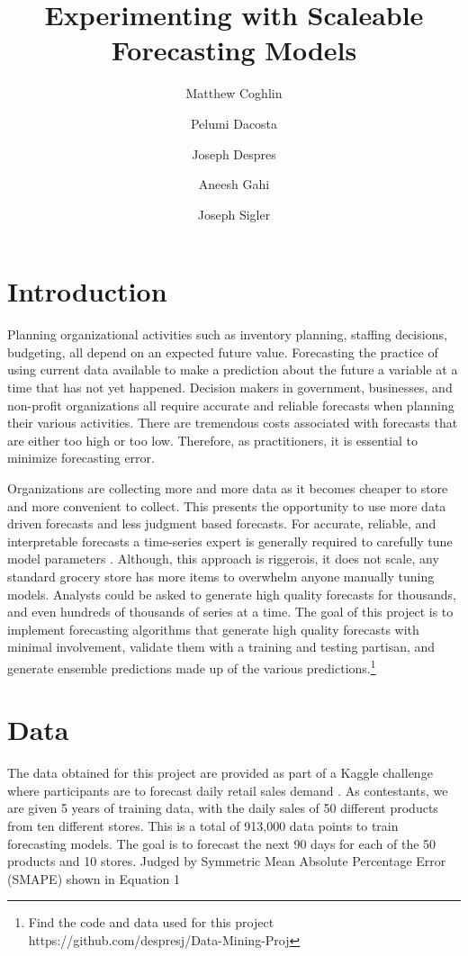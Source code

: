 \documentclass[16pt,twocolumn,letterpaper]{article}
\title{Experimenting with Scaleable Forecasting Models}
\author{
    Matthew Coghlin\\
  	\and
  	Pelumi Dacosta\\
    \and
    Joseph Despres\\
    \and
    Aneesh Gahi\\
    \and
    Joseph Sigler\\
}
\begin{document}
\maketitle



\section{Introduction}

Planning organizational activities such as inventory planning, staffing decisions, budgeting, all depend on an expected future value. Forecasting the practice of using current data available to make a prediction about the future a variable at a time that has not yet happened. Decision makers in government, businesses, and non-profit organizations all require accurate and reliable forecasts when planning their various activities. There are tremendous costs associated with forecasts that are either too high or too low. Therefore, as practitioners, it is essential to minimize forecasting error. 

Organizations are collecting more and more data as it becomes cheaper to store and more convenient to collect. This presents the opportunity to use more data driven forecasts and less judgment based forecasts. For accurate, reliable, and interpretable forecasts a time-series expert is generally required to carefully tune model parameters \cite{taylor2018forecasting}. Although, this approach is riggerois, it does not scale, any standard grocery store has more items to overwhelm anyone manually tuning models. Analysts could be asked to generate high quality forecasts for thousands, and even hundreds of thousands of series at a time. The goal of this project is to implement forecasting algorithms that generate high quality forecasts with minimal involvement, validate them with a training and testing partisan, and generate ensemble predictions made up of the various predictions.\footnote{Find the code and data used for this project https://github.com/despresj/Data-Mining-Proj} 

\section{Data}

The data obtained for this project are provided as part of a Kaggle challenge where participants are to forecast daily retail sales demand \cite{kaggle}. As contestants, we are given 5 years of training data, with the daily sales of 50 different products from ten different stores. This is a total of 913,000 data points to train forecasting models. The goal is to forecast the next 90 days for each of the 50 products and 10 stores. Judged by Symmetric Mean Absolute Percentage Error (SMAPE) shown in Equation 1
\end{document}

